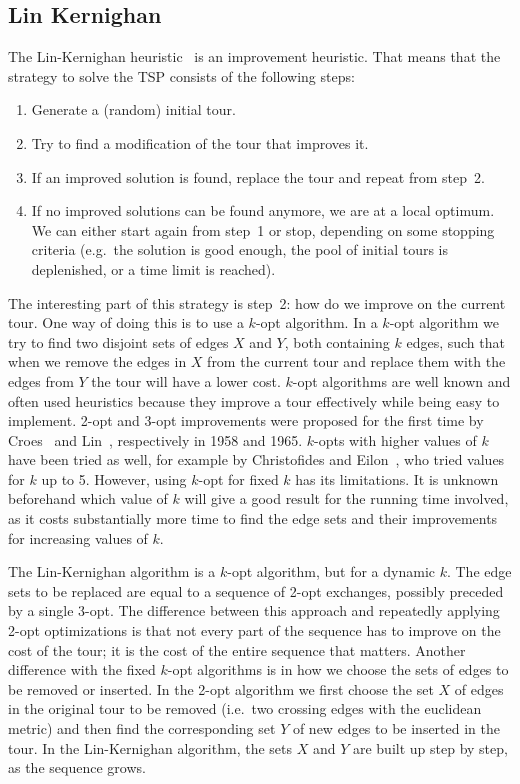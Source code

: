 \documentclass[12pt]{article}
\begin{document}
    \subsection{Lin Kernighan}
    \label{sec:lk}
    The Lin-Kernighan heuristic~\cite{lin-kernighan} is an improvement heuristic. That means that
    the strategy to solve the TSP consists of the following steps:
    \begin{enumerate}
        \item Generate a (random) initial tour.
        \item Try to find a modification of the tour that improves it.
        \item If an improved solution is found, replace the tour and repeat from step~2.
        \item If no improved solutions can be found anymore, we are at a local optimum. We can
            either start again from step~1 or stop, depending on some stopping criteria (e.g.\ the
            solution is good enough, the pool of initial tours is deplenished, or a time limit is
            reached).
    \end{enumerate}

    The interesting part of this strategy is step~2: how do we improve on the current tour. One way
    of doing this is to use a $k$-opt algorithm. In a $k$-opt algorithm we try to find two disjoint
    sets of edges $X$ and $Y$, both containing $k$ edges, such that when we remove the edges in $X$
    from the current tour and replace them with the edges from $Y$ the tour will have a lower cost.
    $k$-opt algorithms are well known and often used heuristics because they improve a tour
    effectively while being easy to implement.
    2-opt and 3-opt improvements were proposed for the first time by Croes~\cite{2-opt} and
    Lin~\cite{3-opt}, respectively in 1958 and 1965. $k$-opts with higher values of $k$ have been
    tried as well, for example by Christofides and Eilon~\cite{2-5-opt}, who tried values for $k$ up
    to 5.
    However, using $k$-opt for fixed $k$ has its limitations. It is unknown beforehand which value
    of $k$ will give a good result for the running time involved, as it costs substantially more
    time to find the edge sets and their improvements for increasing values of $k$.

    The Lin-Kernighan algorithm is a $k$-opt algorithm, but for a dynamic $k$. The edge sets to be
    replaced are equal to a sequence of 2-opt exchanges, possibly preceded by a single 3-opt. The
    difference between this approach and repeatedly applying 2-opt optimizations is that not every
    part of the sequence has to improve on the cost of the tour; it is the cost of the entire
    sequence that matters.
    Another difference with the fixed $k$-opt algorithms is in how we choose the sets of edges to be
    removed or inserted. In the 2-opt algorithm we first choose the set $X$ of edges in the original
    tour to be removed (i.e.\ two crossing edges with the euclidean metric) and then find the
    corresponding set $Y$ of new edges to be inserted in the tour. In the Lin-Kernighan algorithm,
    the sets $X$ and $Y$ are built up step by step, as the sequence grows.
\end{document}
